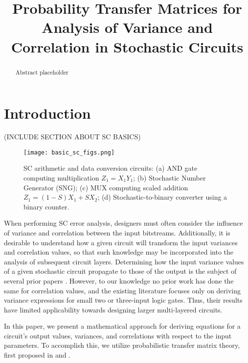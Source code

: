 \documentclass[conference]{IEEEtran}
\begin{document}
\title{Probability Transfer Matrices for Analysis of Variance and Correlation in Stochastic Circuits}
\author{
}
\maketitle

\begin{abstract}
Abstract placeholder
\end{abstract}

\section{Introduction}

(INCLUDE SECTION ABOUT SC BASICS)

\begin{figure}[h!]
    \centering
    \texttt{[image: basic\_sc\_figs.png]}
    \caption{SC arithmetic and data conversion circuits: (a) AND gate computing multiplication $Z_1 = X_1Y_1$; (b) Stochastic Number Generator (SNG); (c) MUX computing scaled addition $Z_1 = (1-S)X_1 + SX_2$; (d) Stochastic-to-binary converter using a binary counter.}
    \label{fig:basic_sc_figs}
\end{figure}

When performing SC error analysis, designers must often consider the influence of variance and correlation between the input bitstreams. Additionally, it is desirable to understand how a given circuit will transform the input variances and correlation values, so that such knowledge may be incorporated into the analysis of subsequent circuit layers. Determining how the input variance values of a given stochastic circuit propagate to those of the output is the subject of several prior papers \cite{UNDERSTANDING_VAR}\cite{RIEDEL_BIT_CORR}. However, to our knowledge no prior work has done the same for correlation values, and the existing literature focuses only on deriving variance expressions for small two or three-input logic gates. Thus, their results have limited applicability towards designing larger multi-layered circuits.

In this paper, we present a mathematical approach for deriving equations for a circuit's output values, variances, and correlations with respect to the input parameters. To accomplish this, we utilize probabilistic transfer matrix theory, first proposed in \cite{PTM} and \cite{EXPLOITING_CORR}.  
\end{document}
